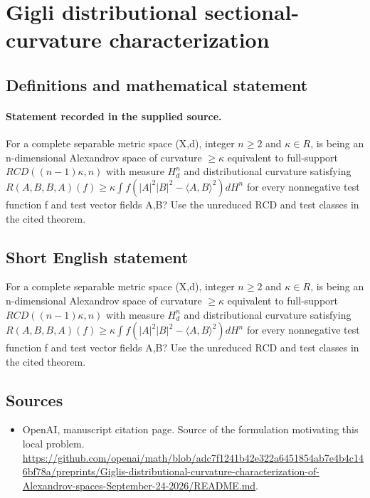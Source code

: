\documentclass[11pt]{article}
\begin{document}
\section*{Gigli distributional sectional-curvature characterization}\label{statement}
\subsection{Definitions and mathematical statement}
\paragraph{Statement recorded in the supplied source.}
For a complete separable metric space (X,d), integer $n\geq 2$ and $\kappa \in R$, is being an n-dimensional Alexandrov space of curvature $\geq \kappa $ equivalent to full-support $RCD((n-1)\kappa ,n)$ with measure $H^{n}_d$ and distributional curvature satisfying $R(A,B,B,A)(f)\geq \kappa \int f(|A|^{2}|B|^{2}-\langle A,B\rangle ^{2})dH^{n}$ for every nonnegative test function f and test vector fields A,B? Use the unreduced RCD and test classes in the cited theorem.
\subsection{Short English statement}
For a complete separable metric space (X,d), integer $n\geq 2$ and $\kappa \in R$, is being an n-dimensional Alexandrov space of curvature $\geq \kappa $ equivalent to full-support $RCD((n-1)\kappa ,n)$ with measure $H^{n}_d$ and distributional curvature satisfying $R(A,B,B,A)(f)\geq \kappa \int f(|A|^{2}|B|^{2}-\langle A,B\rangle ^{2})dH^{n}$ for every nonnegative test function f and test vector fields A,B? Use the unreduced RCD and test classes in the cited theorem.
\subsection{Sources}
\begin{itemize}
\item[S1] OpenAI, manuscript citation page. Source of the formulation motivating this local problem.
\url{https://github.com/openai/math/blob/adc7f1241b42e322a6451854ab7e4b4c146bf78a/preprints/Giglis-distributional-curvature-characterization-of-Alexandrov-spaces-September-24-2026/README.md}.
\end{itemize}
\end{document}
